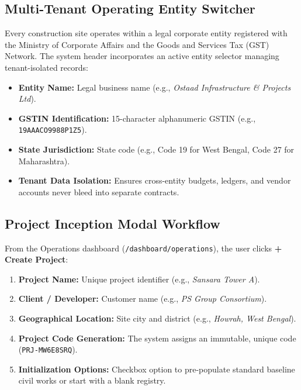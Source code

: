 \documentclass[11pt,a4paper]{article}
\begin{document}
\subsection{Multi-Tenant Operating Entity Switcher}
Every construction site operates within a legal corporate entity registered with the Ministry of Corporate Affairs and the Goods and Services Tax (GST) Network. 
The system header incorporates an active entity selector managing tenant-isolated records:
\begin{itemize}[noitemsep]
    \item \textbf{Entity Name:} Legal business name (e.g., \textit{Ostaad Infrastructure \& Projects Ltd}).
    \item \textbf{GSTIN Identification:} 15-character alphanumeric GSTIN (e.g., \texttt{19AAACO9988P1Z5}).
    \item \textbf{State Jurisdiction:} State code (e.g., Code 19 for West Bengal, Code 27 for Maharashtra).
    \item \textbf{Tenant Data Isolation:} Ensures cross-entity budgets, ledgers, and vendor accounts never bleed into separate contracts.
\end{itemize}

\subsection{Project Inception Modal Workflow}
From the Operations dashboard (\texttt{/dashboard/operations}), the user clicks \textbf{+ Create Project}:
\begin{enumerate}[noitemsep]
    \item \textbf{Project Name:} Unique project identifier (e.g., \textit{Sansara Tower A}).
    \item \textbf{Client / Developer:} Customer name (e.g., \textit{PS Group Consortium}).
    \item \textbf{Geographical Location:} Site city and district (e.g., \textit{Howrah, West Bengal}).
    \item \textbf{Project Code Generation:} The system assigns an immutable, unique code (\texttt{PRJ-MW6E8SRQ}).
    \item \textbf{Initialization Options:} Checkbox option to pre-populate standard baseline civil works or start with a blank registry.
\end{enumerate}

\end{document}
